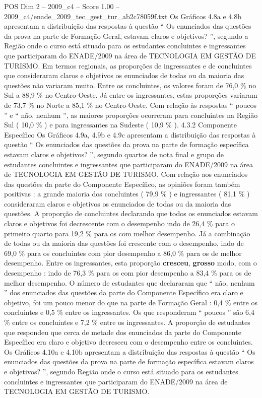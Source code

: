 \begin{textsample}{POS Dim 2 – 2009\_c4 – Score 1.00 – 2009\_c4/enade\_2009\_tec\_gest\_tur\_ab2c78059f.txt}
Os Gráficos 4.8a e 4.8b apresentam a distribuição das respostas à questão “ Os enunciados das questões da prova na parte de Formação Geral, estavam claros e objetivos? ”, segundo a Região onde o curso está situado para os estudantes concluintes e ingressantes que participaram do ENADE/2009 na área de TECNOLOGIA EM GESTÃO DE TURISMO.
Em termos regionais, as proporções de ingressantes e de concluintes que consideraram claros e objetivos os enunciados de todas ou da maioria das questões não variaram muito.
Entre os concluintes, os valores foram de 76,0 \% no Sul a 88,9 \% no Centro-Oeste.
Já entre os ingressantes, estas proporções variaram de 73,7 \% no Norte a 85,1 \% no Centro-Oeste.
Com relação às respostas “ poucos ” e “ não, nenhum ”, as maiores proporções ocorreram para concluintes na Região Sul ( 10,0 \% ) e para ingressantes na Sudeste ( 10,9 \% ). 4.3.2 Componente Específico Os Gráficos 4.9a, 4.9b e 4.9c apresentam a distribuição das respostas à questão “ Os enunciados das questões da prova na parte de formação específica estavam claros e objetivos? ”, segundo quartos de nota final e grupo de estudantes concluintes e ingressantes que participaram do ENADE/2009 na área de TECNOLOGIA EM GESTÃO DE TURISMO.
Com relação aos enunciados das questões da parte do Componente Específico, as opiniões foram também positivas : a grande maioria dos concluintes ( 79,9 \% ) e ingressantes ( 81,1 \% ) consideraram claros e objetivos os enunciados de todas ou da maioria das questões.
A proporção de concluintes declarando que todos os enunciados estavam claros e objetivos foi decrescente com o desempenho indo de 26,4 \% para o primeiro quarto para 19,2 \% para os com melhor desempenho.
Já a combinação de todas ou da maioria das questões foi crescente com o desempenho, indo de 69,0 \% para os concluintes com pior desempenho a 86,0 \% para os de melhor desempenho.
Entre os ingressantes, esta proporção \textbf{cresceu}, \textbf{grosso} modo, com o desempenho : indo de 76,3 \% para os com pior desempenho a 83,4 \% para os de melhor desempenho.
O número de estudantes que declararam que “ não, nenhum ” dos enunciados das questões da parte do Componente Específico era claro e objetivo, foi um pouco menor do que na parte de Formação Geral : 0,4 \% entre os concluintes e 0,5 \% entre os ingressantes.
Os que responderam “ poucos ” são 6,4 \% entre os concluintes e 7,2 \% entre os ingressantes.
A proporção de estudantes que respondeu que cerca de metade dos enunciados da parte do Componente Específico era claro e objetivo decresceu com o desempenho entre os concluintes.
Os Gráficos 4.10a e 4.10b apresentam a distribuição das respostas à questão “ Os enunciados das questões da prova na parte de formação específica estavam claros e objetivos? ”, segundo Região onde o curso está situado para os estudantes concluintes e ingressantes que participaram do ENADE/2009 na área de TECNOLOGIA EM GESTÃO DE TURISMO.

\end{textsample}
